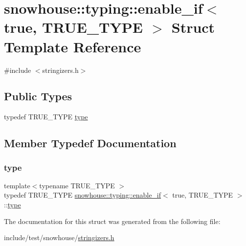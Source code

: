 \hypertarget{structsnowhouse_1_1typing_1_1enable__if_3_01true_00_01TRUE__TYPE_01_4}{}\section{snowhouse\+::typing\+::enable\+\_\+if$<$ true, T\+R\+U\+E\+\_\+\+T\+Y\+PE $>$ Struct Template Reference}
\label{structsnowhouse_1_1typing_1_1enable__if_3_01true_00_01TRUE__TYPE_01_4}


{\ttfamily \#include $<$stringizers.\+h$>$}

\subsection*{Public Types}
\begin{DoxyCompactItemize}
\item 
typedef T\+R\+U\+E\+\_\+\+T\+Y\+PE \mbox{\hyperlink{structsnowhouse_1_1typing_1_1enable__if_3_01true_00_01TRUE__TYPE_01_4_a1527e9f9cc647184085c7bdca07320ef}{type}}
\end{DoxyCompactItemize}


\subsection{Member Typedef Documentation}
\mbox{\label{structsnowhouse_1_1typing_1_1enable__if_3_01true_00_01TRUE__TYPE_01_4_a1527e9f9cc647184085c7bdca07320ef}} 
\subsubsection{\texorpdfstring{type}{type}}
{\footnotesize\ttfamily template$<$typename T\+R\+U\+E\+\_\+\+T\+Y\+PE $>$ \\
typedef T\+R\+U\+E\+\_\+\+T\+Y\+PE \mbox{\hyperlink{structsnowhouse_1_1typing_1_1enable__if}{snowhouse\+::typing\+::enable\+\_\+if}}$<$ true, T\+R\+U\+E\+\_\+\+T\+Y\+PE $>$\+::\mbox{\hyperlink{structsnowhouse_1_1typing_1_1enable__if_3_01true_00_01TRUE__TYPE_01_4_a1527e9f9cc647184085c7bdca07320ef}{type}}}



The documentation for this struct was generated from the following file\+:\begin{DoxyCompactItemize}
\item 
include/test/snowhouse/\mbox{\hyperlink{stringizers_8h}{stringizers.\+h}}\end{DoxyCompactItemize}
